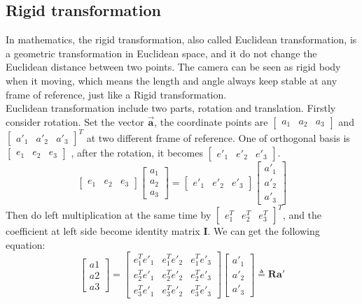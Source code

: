\subsection{Rigid transformation}
In mathematics, the rigid transformation, also called Euclidean transformation, is a geometric transformation in  Euclidean space, and it do not change the Euclidean distance between two points. The camera can be seen as rigid body when it moving, which means the length and angle always keep stable at any frame of reference, just like a Rigid transformation.\\
Euclidean transformation include two parts, rotation and translation. Firstly consider rotation. Set the vector $\pmb{\vec{a}}$, the coordinate points are
$
    \begin{bmatrix} 
        a_1 & a_2 & a_3
    \end{bmatrix} 
$
and 
$
\left[
\begin{matrix} 
    a'_1 & a'_2 & a'_3
\end{matrix} 
\right]^T
$ at two different frame of reference. One of orthogonal basis is 
$
\begin{bmatrix} 
    e_1 & e_2 & e_3
\end{bmatrix} 
$
, after the rotation, it becomes 
$
    \begin{bmatrix} 
        e'_1 & e'_2 & e'_3
    \end{bmatrix} 
$.
$$
   \begin{bmatrix}
        e_1 & e_2 & e_3
   \end{bmatrix} 
   \begin{bmatrix}
    a_1\\
    a_2\\
    a_3
    \end{bmatrix}
    =
    \begin{bmatrix}
    e'_1 & e'_2 & e'_3
    \end{bmatrix}
    \begin{bmatrix}
    a'_1\\
    a'_2\\
    a'_3
    \end{bmatrix}
$$
Then do left multiplication at the same time by 
$
    \left[
    \begin{matrix}
    e_1^T & e_2^T & e_3^T
    \end{matrix}
    \right]^T
$, and the coefficient at left side become identity matrix $\pmb{I}$. We can get the following equation:
$$
    \begin{bmatrix}
        a1\\
        a2\\
        a3
    \end{bmatrix}=
    \begin{bmatrix}
        e^T_1e'_1 & e^T_1e'_2 & e^T_1e'_3\\
        e^T_2e'_1 & e^T_2e'_2 & e^T_2e'_3\\
        e^T_3e'_1 & e^T_3e'_2 & e^T_3e'_3
    \end{bmatrix}
    \begin{bmatrix}
    a'_1\\
    a'_2\\
    a'_3
    \end{bmatrix}
    \triangleq \pmb{Ra}'
$$
